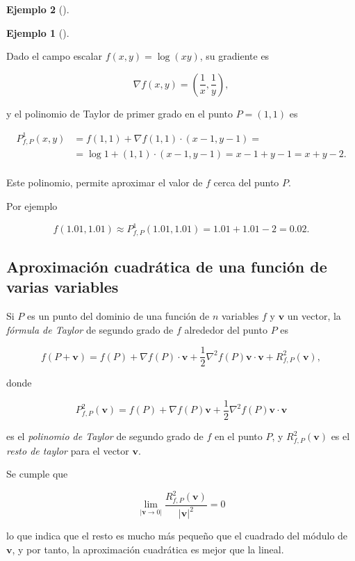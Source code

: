\documentclass[
  a4paper,
]{scrreport}
\theoremstyle{definition}
\newtheorem{example}{Ejemplo}[chapter]
\theoremstyle{plain}
\theoremstyle{definition}
\theoremstyle{definition}
\theoremstyle{plain}
\theoremstyle{plain}
\theoremstyle{remark}
\begin{document}
\begin{example}[]
\begin{example}[]\protect\hypertarget{exm-aproximacion-lineal-funcion-varias-variables}{}\label{exm-aproximacion-lineal-funcion-varias-variables}

Dado el campo escalar \(f(x,y)=\log(xy)\), su gradiente es

\[
\nabla f(x,y) = \left(\frac{1}{x},\frac{1}{y}\right),
\]

y el polinomio de Taylor de primer grado en el punto \(P=(1,1)\) es

\begin{align*}
P^1_{f,P}(x,y) &= f(1,1) +\nabla f(1,1)\cdot (x-1,y-1) = \\
&= \log 1+(1,1)\cdot(x-1,y-1) = x-1+y-1 = x+y-2.\\
\end{align*}

Este polinomio, permite aproximar el valor de \(f\) cerca del punto
\(P\).

Por ejemplo

\[
f(1.01,1.01) \approx P^1_{f,P}(1.01,1.01) = 1.01+1.01-2 = 0.02.
\]

\end{example}

\subsection{Aproximación cuadrática de una función de varias
variables}\label{aproximaciuxf3n-cuadruxe1tica-de-una-funciuxf3n-de-varias-variables}

Si \(P\) es un punto del dominio de una función de \(n\) variables \(f\)
y \(\mathbf{v}\) un vector, la \emph{fórmula de Taylor} de segundo grado
de \(f\) alrededor del punto \(P\) es

\[
f(P+\mathbf{v}) = f(P) + \nabla f(P)\cdot \mathbf{v} + \frac{1}{2}\nabla^2f(P)\mathbf{v}\cdot\mathbf{v} + R^2_{f,P}(\mathbf{v}),
\]

donde

\[
P^2_{f,P}(\mathbf{v}) = f(P)+\nabla f(P)\mathbf{v}+\frac{1}{2}\nabla^2f(P)\mathbf{v}\cdot\mathbf{v}
\]

es el \emph{polinomio de Taylor} de segundo grado de \(f\) en el punto
\(P\), y \(R^2_{f,P}(\mathbf{v})\) es el \emph{resto de taylor} para el
vector \(\mathbf{v}\).

Se cumple que

\[
\lim_{|\mathbf{v}\rightarrow 0|} \frac{R^2_{f,P}(\mathbf{v})}{|\mathbf{v}|^2} = 0
\]

lo que indica que el resto es mucho más pequeño que el cuadrado del
módulo de \(\mathbf{v}\), y por tanto, la aproximación cuadrática es
mejor que la lineal.


\end{example}
\end{document}
